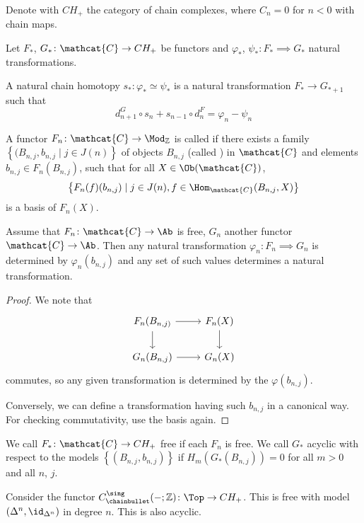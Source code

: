 Denote with $CH_+$ the category of chain complexes,
where  $C_n = 0$ for  $n<0$ with chain maps.

Let $F_*$, $G_*\colon \mathcat{C} \to  CH_+$ be functors
and $\varphi _*$, $\psi _*\colon  F_* \implies G_*$ natural transformations.

\begin{definition}
  A natural chain homotopy $s_* \colon  \varphi _* \simeq \psi _*$
  is a natural transformation $F_* \to  G_{* + 1}$
  such that
  \[
  d_{n+1}^G \circ  s_n + s_{n-1} \circ  d_n^F = \varphi _n - \psi _n
  \] 
\end{definition}

\begin{definition}
  A functor $F_n\colon \mathcat{C} \to \Mod_{\mathbb{Z}}$
  is called  if there exists a family
  $\left\{(B_{n,j}, b_{n,j} \mid  j\in J(n) \right\} $ 
  of objects $B_{n,j}$ (called ) in $\mathcat{C}$
  and elements $b_{n,j} \in F_n(B_{n,j})$,
  such that for all $X\in \Ob(\mathcat{C})$,
  \[
  \left\{F_n(f) (b_{n,j}) \mid  j\in J(n), f\in \Hom_{\mathcat{C}}(B_{n,j},X) \right\} 
  \]
  is a basis of $F_n(X)$.
\end{definition}

\begin{remark}
  Assume that $F_n\colon \mathcat{C} \to  \Ab$ is free,
  $G_n$ another functor  $\mathcat{C} \to  \Ab$.
  Then any natural transformation $\varphi _n \colon F_n \implies G_n$
  is determined by $\varphi _n(b_{n,j})$
  and any set of such values determines a natural transformation.
\end{remark}

\begin{proof}
  We note that
  \[
  \begin{tikzcd}
    F_n(B_{n,j)} \ar[swap]{d}{} \ar{r}{} & F_n(X) \ar{d}{} \\
   G_n(B_{n,j})  \ar[swap]{r}{} & G_n(X)
  \end{tikzcd}
  \]
  commutes, so any given transformation is determined by the $\varphi (b_{n,j})$.

  Conversely, we can define a transformation having such $b_{n,j}$
  in a canonical way.
  For checking commutativity, use the basis again.
\end{proof}

\begin{definition}
  We call $F_* \colon  \mathcat{C} \to  CH_+$ free if each $F_n$ is free.
  We call  $G_*$ acyclic with respect to the models
   $\left\{(B_{n,j}, b_{n,j})\right\} $ 
   if $H_m(G_*(B_{n,j})) = 0$ for all $m>0$ and all $n$,  $j$.
\end{definition}

\begin{example}
  Consider the functor
  $C_\chainbullet ^{\sing}(\blank ; \mathbb{Z})\colon \Top \to CH_+$.
  This is free with model $(\Delta^n, \id_{\Delta^n})$ in degree $n$.
  This is also acyclic.
\end{example}
